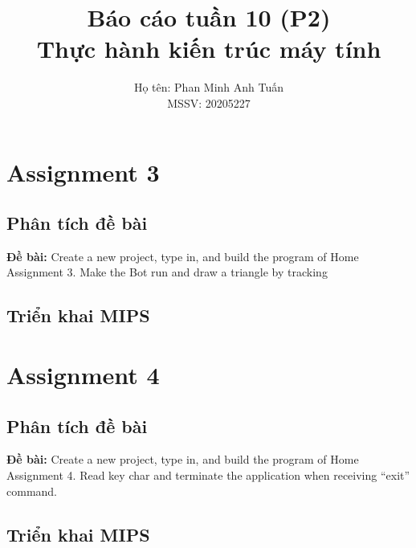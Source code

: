\documentclass[a4paper,12pt]{article}
\title{\textbf{Báo cáo tuần 10 (P2) \\ Thực hành kiến trúc máy tính}}
\author{Họ tên: Phan Minh Anh Tuấn \\ MSSV: 20205227}
\date{}
\begin{document}
\maketitle
\tableofcontents
\newpage
\section{Assignment 3}
\subsection{Phân tích đề bài}
\textbf{Đề bài: }Create a new project, type in, and build the program of Home Assignment 3. Make the Bot run and draw a triangle by tracking \\
\subsection{Triển khai MIPS}
\clearpage
\section{Assignment 4}
\subsection{Phân tích đề bài}
\textbf{Đề bài: }Create a new project, type in, and build the program of Home Assignment 4. Read key char and terminate the application when receiving “exit” command. \\
\subsection{Triển khai MIPS}
\end{document}
